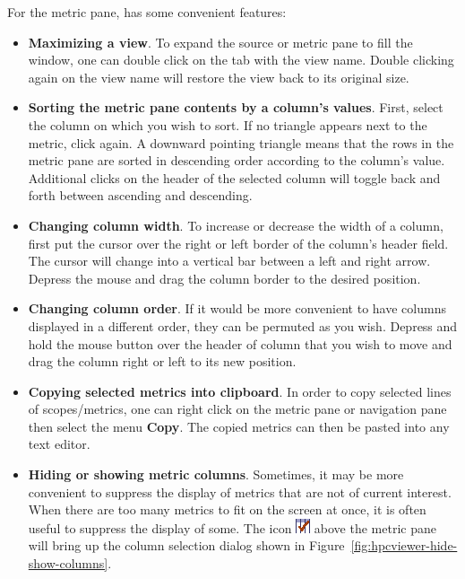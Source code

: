 For the metric pane, \hpcviewer{} has some convenient features:
\begin{itemize}

\item \textbf{Maximizing a view}.
  To expand the source or metric pane to fill the window, one can double click on the tab with the view name.
  Double clicking again on the view name will restore the view back to its original size.

\item \textbf{Sorting the metric pane contents by a column's values}.
  First, select the column on which you wish to sort.
  If no triangle appears next to the metric, click again.
  A downward pointing triangle means that the rows in the metric pane are sorted in descending order according to the column's value.
  Additional clicks on the header of the selected column will toggle back and forth between ascending and descending.

\item \textbf{Changing column width}.
  To increase or decrease the width of a column, first put the cursor over the right or left border of the column's header field.
  The cursor will change into a vertical bar between a left and right arrow.
  Depress the mouse and drag the column border to the desired position.

\item \textbf{Changing column order}.
  If it would be more convenient to have columns displayed in a different order, they can be permuted as you wish.
  Depress and hold the mouse button over the header of column that you wish to move and drag the column right or left to its new position.

\item \textbf{Copying selected metrics into clipboard}.
  In order to copy selected lines of scopes/metrics, one can right click on the metric pane or navigation pane then select the menu \textbf{Copy}.
  The copied metrics can then be pasted into any text editor.

\item \textbf{Hiding or showing metric columns}.
  Sometimes, it may be more convenient to suppress the display of metrics that are not of current interest.
  When there are too many metrics to fit on the screen at once, it is often useful to suppress the display of some.
  The icon \includegraphics[scale=.7]{fig/hpcviewer-button-checkcolumns.png} above the metric pane will bring up the column selection dialog shown in Figure~\ref{fig:hpcviewer-hide-show-columns}.


\end{itemize}
